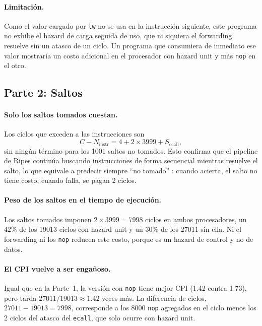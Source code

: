 \documentclass[11pt,a4paper]{article}
\begin{document}
\paragraph{Limitaci\'on.}
Como el valor cargado por \texttt{lw} no se usa en la instrucci\'on siguiente,
este programa no exhibe el hazard de carga seguida de uso, que ni siquiera el
forwarding resuelve sin un atasco de un ciclo. Un programa que consumiera
de inmediato ese valor mostrar\'ia un costo adicional en el procesador con
hazard unit y m\'as \texttt{nop} en el otro.

\subsection{Parte 2: Saltos}

\paragraph{Solo los saltos tomados cuestan.}
Los ciclos que exceden a las instrucciones son
\begin{equation}
  C - N_{\text{instr}} = 4 + 2 \times 3999 + S_{\text{ecall}},
\end{equation}
sin ning\'un t\'ermino para los 1001 saltos no tomados. Esto confirma que el
pipeline de Ripes contin\'ua buscando instrucciones de forma secuencial mientras
resuelve el salto, lo que equivale a predecir siempre ``no tomado''
\cite{patterson}: cuando acierta, el salto no tiene costo; cuando falla, se
pagan 2 ciclos.
 
\paragraph{Peso de los saltos en el tiempo de ejecuci\'on.}
Los saltos tomados imponen $2 \times 3999 = 7998$ ciclos en ambos
procesadores, un $42\%$ de los 19013 ciclos con hazard unit y un $30\%$ de los
27011 sin ella. Ni el forwarding ni los \texttt{nop} reducen este costo, porque
es un hazard de control y no de datos.
 
\paragraph{El CPI vuelve a ser enga\~noso.}
Igual que en la Parte~1, la versi\'on con \texttt{nop} tiene mejor CPI (1.42
contra 1.73), pero tarda $27011/19013 \approx 1.42$ veces m\'as. La diferencia
de ciclos, $27011 - 19013 = 7998$, corresponde a los 8000 \texttt{nop}
agregados en el ciclo menos los 2 ciclos del atasco del \texttt{ecall}, que
solo ocurre con hazard unit.
 
\end{document}
